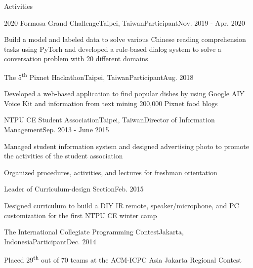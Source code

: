 \documentclass{resume} %
\newcommand{\ts}{\textsuperscript}
\begin{document}
\begin{rSection}{Activities}
    \begin{rSubsection}{2020 Formosa Grand Challenge}{Taipei, Taiwan}{Participant}{Nov. 2019 - Apr. 2020}
        \item Build a model and labeled data to solve various Chinese reading comprehension tasks using PyTorh and 
              developed a rule-based dialog system to solve a conversation problem with 20 different domains
    \end{rSubsection}
    \begin{rSubsection}{The 5\ts{th} Pixnet Hackathon}{Taipei, Taiwan}{Participant}{Aug. 2018}
        \item Developed a web-based application to find popular dishes by using Google AIY Voice Kit and information from text mining 200,000 Pixnet food blogs
    \end{rSubsection}
    \begin{rSubsection}{NTPU CE Student Association}{Taipei, Taiwan}{Director of Information Management}{Sep. 2013 - June 2015}
        \item Managed student information system and designed advertising photo to promote the activities of the student association
        \item Organized procedures, activities, and lectures for freshman orientation
    \end{rSubsection}
    \begin{rSubsection2}{Leader of Curriculum-design Section}{Feb. 2015}
        \item Designed curriculum to build a DIY IR remote, speaker/microphone, and PC customization for the first NTPU CE winter camp
    \end{rSubsection2}
    \begin{rSubsection}{The International Collegiate Programming Contest}{Jakarta, Indonesia}{Participant}{Dec. 2014}
        \item Placed 29\ts{th} out of 70 teams at the ACM-ICPC Asia Jakarta Regional Contest
    \end{rSubsection}
\end{rSection}

\end{document}
